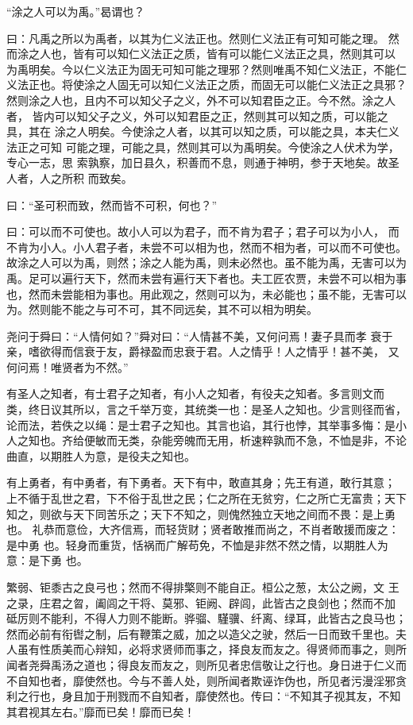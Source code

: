 \documentclass[]{article}
\begin{document}
``涂之人可以为禹。''曷谓也？

曰：凡禹之所以为禹者，以其为仁义法正也。然则仁义法正有可知可能之理。
然而涂之人也，皆有可以知仁义法正之质，皆有可以能仁义法正之具，然则其可以
为禹明矣。今以仁义法正为固无可知可能之理邪？然则唯禹不知仁义法正，不能仁
义法正也。将使涂之人固无可以知仁义法正之质，而固无可以能仁义法正之具邪？
然则涂之人也，且内不可以知父子之义，外不可以知君臣之正。今不然。涂之人者，
皆内可以知父子之义，外可以知君臣之正，然则其可以知之质，可以能之具，其在
涂之人明矣。今使涂之人者，以其可以知之质，可以能之具，本夫仁义法正之可知
可能之理，可能之具，然则其可以为禹明矣。今使涂之人伏术为学，专心一志，思
索孰察，加日县久，积善而不息，则通于神明，参于天地矣。故圣人者，人之所积
而致矣。

曰：``圣可积而致，然而皆不可积，何也？''

曰：可以而不可使也。故小人可以为君子，而不肯为君子；君子可以为小人，
而不肯为小人。小人君子者，未尝不可以相为也，然而不相为者，可以而不可使也。
故涂之人可以为禹，则然；涂之人能为禹，则未必然也。虽不能为禹，无害可以为
禹。足可以遍行天下，然而未尝有遍行天下者也。夫工匠农贾，未尝不可以相为事
也，然而未尝能相为事也。用此观之，然则可以为，未必能也；虽不能，无害可以
为。然则能不能之与可不可，其不同远矣，其不可以相为明矣。

尧问于舜曰：``人情何如？''舜对曰：``人情甚不美，又何问焉！妻子具而孝
衰于亲，嗜欲得而信衰于友，爵禄盈而忠衰于君。人之情乎！人之情乎！甚不美，
又何问焉！唯贤者为不然。''

有圣人之知者，有士君子之知者，有小人之知者，有役夫之知者。多言则文而
类，终日议其所以，言之千举万变，其统类一也：是圣人之知也。少言则径而省，
论而法，若佚之以绳：是士君子之知也。其言也谄，其行也悖，其举事多悔：是小
人之知也。齐给便敏而无类，杂能旁魄而无用，析速粹孰而不急，不恤是非，不论
曲直，以期胜人为意，是役夫之知也。

有上勇者，有中勇者，有下勇者。天下有中，敢直其身；先王有道，敢行其意；
上不循于乱世之君，下不俗于乱世之民；仁之所在无贫穷，仁之所亡无富贵；天下
知之，则欲与天下同苦乐之；天下不知之，则傀然独立天地之间而不畏：是上勇也。
礼恭而意俭，大齐信焉，而轻货财；贤者敢推而尚之，不肖者敢援而废之：是中勇
也。轻身而重货，恬祸而广解苟免，不恤是非然不然之情，以期胜人为意：是下勇
也。

繁弱、钜黍古之良弓也；然而不得排檠则不能自正。桓公之葱，太公之阙，文
王之录，庄君之曶，阖闾之干将、莫邪、钜阙、辟闾，此皆古之良剑也；然而不加
砥厉则不能利，不得人力则不能断。骅骝、騹骥、纤离、绿耳，此皆古之良马也；
然而必前有衔辔之制，后有鞭策之威，加之以造父之驶，然后一日而致千里也。夫人虽有性质美而心辩知，必将求贤师而事之，择良友而友之。得贤师而事之，则所
闻者尧舜禹汤之道也；得良友而友之，则所见者忠信敬让之行也。身日进于仁义而
不自知也者，靡使然也。今与不善人处，则所闻者欺诬诈伪也，所见者污漫淫邪贪
利之行也，身且加于刑戮而不自知者，靡使然也。传曰：``不知其子视其友，不知
其君视其左右。''靡而已矣！靡而已矣！
\end{document}
